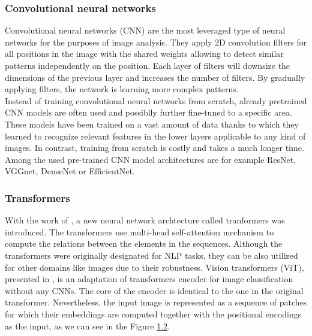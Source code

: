 \subsubsection{Convolutional neural networks}
Convolutional neural networks (CNN)\citep{o2015introduction} are the most leveraged type of neural networks for the purposes of image analysis. They apply 2D convolution filters for all positions in the image with the shared weights allowing to detect similar patterns independently on the position. Each layer of filters will downsize the dimensions of the previous layer and increases the number of filters. By gradually applying filters, the network is learning more complex patterns.\\

Instead of training convolutional neural networks from scratch, already pretrained CNN models are often used and possiblly further fine-tuned to a specific area. These models have been trained on a vast amount of data thanks to which they learned to recognize relevant features in the lower layers applicable to any kind of images. In contrast, training from scratch is costly and takes a much longer time. Among the used pre-trained CNN model architectures are for example ResNet\citep{he2016deep}, VGGnet\citep{simonyan2014very}, DenseNet\citep{huang2017densely} or EfficientNet\citep{tan2019efficientnet}.

\subsubsection{Transformers}
\label{sec:transformersEncoder}
With the work of \citet{vaswani2017attention}, a new neural network archtecture called tranformers was introduced. The transformers use multi-head self-attention mechanism to compute the relations between the elements in the sequences. Although the transformers were originally designated for NLP tasks, they can be also utilized for other domains like images due to their robustness. Vision transformers (ViT), presented in \citet{dosovitskiy2020image}, is an adaptation of transformers encoder for image classification without any CNNs. The core of the encoder is identical to the one in the original transformer. Nevertheless, the input image is represented as a sequence of patches for which their embeddings are computed together with the positional encodings as the input, as we can see in the Figure \hyperref[fig02:ViT]{1.2}.

